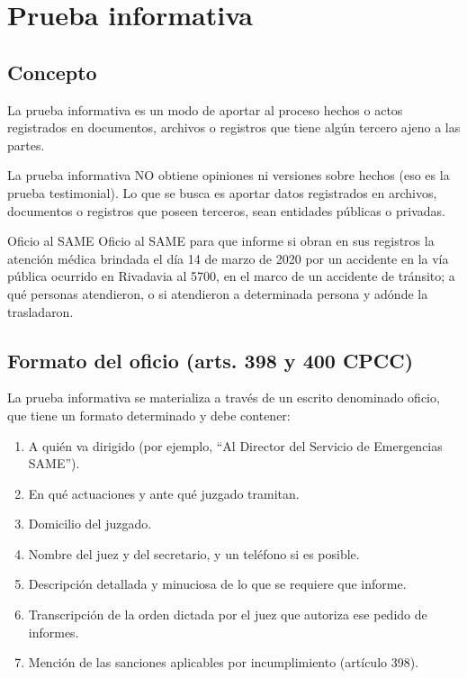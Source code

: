 \documentclass[12pt,oneside]{book}
\begin{document}
\chapter{Prueba informativa}

\section{Concepto}

La prueba informativa es un modo de aportar al proceso hechos o actos registrados en documentos, archivos o registros que tiene algún tercero ajeno a las partes.

\begin{important}
La prueba informativa NO obtiene opiniones ni versiones sobre hechos (eso es la prueba testimonial). Lo que se busca es aportar datos registrados en archivos, documentos o registros que poseen terceros, sean entidades públicas o privadas.
\end{important}

\begin{example}{Oficio al SAME}
Oficio al SAME para que informe si obran en sus registros la atención médica brindada el día 14 de marzo de 2020 por un accidente en la vía pública ocurrido en Rivadavia al 5700, en el marco de un accidente de tránsito; a qué personas atendieron, o si atendieron a determinada persona y adónde la trasladaron.
\end{example}

\section{Formato del oficio (arts. 398 y 400 CPCC)}

La prueba informativa se materializa a través de un escrito denominado oficio, que tiene un formato determinado y debe contener:

\begin{enumerate}
    \item A quién va dirigido (por ejemplo, ``Al Director del Servicio de Emergencias SAME'').
    \item En qué actuaciones y ante qué juzgado tramitan.
    \item Domicilio del juzgado.
    \item Nombre del juez y del secretario, y un teléfono si es posible.
    \item Descripción detallada y minuciosa de lo que se requiere que informe.
    \item Transcripción de la orden dictada por el juez que autoriza ese pedido de informes.
    \item Mención de las sanciones aplicables por incumplimiento (artículo 398).
\end{enumerate}
\end{document}
